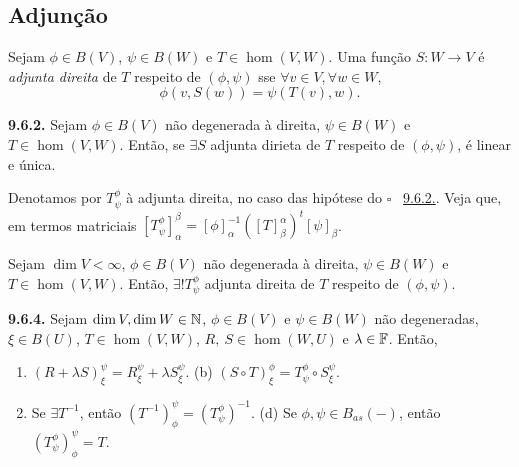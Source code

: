 \subsection{Adjunção}

\begin{definition}
    Sejam \(\phi \in B(V)\), \(\psi \in B(W)\) e \(T \in \hom (V,W)\). Uma função \(S: W \to V\) é \emph{adjunta direita} de \(T\) respeito de \((\phi, \psi)\) sse \(\forall v\in V, \forall w \in W\), 
    \[ \phi(v, S(w)) = \psi(T(v), w).\]  
\end{definition}

\hypertarget{lemma962}{}
\begin{lemma}
    \textbf{9.6.2.} Sejam \(\phi \in B(V)\) não degenerada à direita, \(\psi \in B(W)\) e \(T \in \hom(V,W)\). Então, se \(\exists S\) adjunta dirieta de \(T\) respeito de \((\phi, \psi)\), é linear e única.    
\end{lemma}


\begin{note}
    Denotamos por \(T^\phi_\psi\) à adjunta direita, no caso das hipótese do {\scriptsize \(\square\)} \ \hyperlink{lemma962}{9.6.2.}. Veja que, em termos matriciais \([T^\phi_\psi]^\beta_\alpha = [\phi]^{-1}_\alpha ([T]^\alpha_\beta)^t[\psi]_\beta\). 
\end{note}

\begin{proposition}
    Sejam \(\dim V < \infty\), \(\phi \in B(V)\) não degenerada à direita, \(\psi \in B(W)\) e \(T\in \hom(V,W)\). Então, \(\exists ! T^\phi_\psi\) adjunta direita de \(T\) respeito de \((\phi, \psi)\). 
\end{proposition}

\begin{lemma}
    \textbf{9.6.4.} Sejam \(\dim V, \dim W \in \mathbb{N}\), \(\phi \in B(V)\) e \(\psi \in B(W)\) não degeneradas, \(\xi \in B(U)\), \(T \in \hom(V,W)\), \(R, \ S  \in \hom (W,U)\) e \(\lambda \in \mathbb{F}\). Então, 
    \vspace{-0.2cm}
    \begin{enumerate}[left = 0.5cm, label = (\alph*)]
        \item \((R+\lambda S)^\psi_\xi = R^\psi_\xi + \lambda S^\psi_\xi\). \hspace{2.35cm} (b) \((S\circ T)^\phi_\xi = T^\phi_\psi \circ S^\psi_\xi\). 
        \item[(c)] Se \(\exists T^{-1}\), então \((T^{-1})^\psi_\phi = (T^\phi_\psi)^{-1}\). \hspace{0.8cm}(d) Se \(\phi, \psi \in B_{as}(-)\), então \((T^\phi_\psi)^\psi_\phi = T\). 
    \end{enumerate}
\end{lemma}

